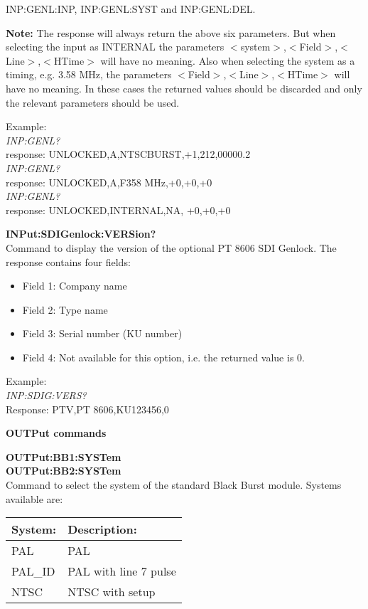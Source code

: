 INP:GENL:INP, INP:GENL:SYST and INP:GENL:DEL.

\textbf{Note:} The response will always return the above six parameters. But when selecting the input as INTERNAL the parameters $<$system$>$,$<$Field$>$,$<$Line$>$,$<$HTime$>$ will have no meaning. Also when selecting the system as a timing, e.g. 3.58 MHz, the parameters $<$Field$>$,$<$Line$>$,$<$HTime$>$ will have no meaning. In these cases the returned values should be discarded and only the relevant parameters should be used.

Example:\\
\textit{INP:GENL?}\\
response: UNLOCKED,A,NTSCBURST,+1,212,00000.2\\
\textit{INP:GENL?}\\
response: UNLOCKED,A,F358 MHz,+0,+0,+0\\
\textit{INP:GENL?}\\
response: UNLOCKED,INTERNAL,NA, +0,+0,+0

\textbf{INPut:SDIGenlock:VERSion?}\\
Command to display the version of the optional PT 8606 SDI Genlock. The response contains four fields:
\begin{itemize}
\item Field 1: Company name
\item Field 2: Type name
\item Field 3: Serial number (KU number)
\item Field 4: Not available for this option, i.e. the returned value is 0.
\end{itemize}

Example:\\
\textit{INP:SDIG:VERS?}\\
Response: PTV,PT 8606,KU123456,0

\textbf{OUTPut commands}

\textbf{OUTPut:BB1:SYSTem}\\
\textbf{OUTPut:BB2:SYSTem}\\
Command to select the system of the standard Black Burst module. Systems available are:

\begin{tabular}{|l|l|}
\hline
\textbf{System:} & \textbf{Description:} \\ \hline
PAL & PAL \\ \hline
PAL\_ID & PAL with line 7 pulse \\ \hline
NTSC & NTSC with setup \\ 
\hline
\end{tabular}


